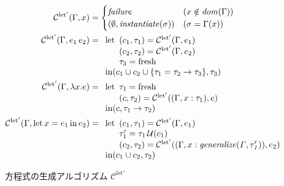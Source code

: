 \begin{figure}[htbp]
  \begin{align*}
    \mathcal C^\mathrm{let'}(\Gamma, x) &=
    \begin{cases}
      \mathit{failure}                          & (x \notin \mathit{dom}(\Gamma)) \\
      (\emptyset, \mathit{instantiate}(\sigma)) & (\sigma = \Gamma(x))
    \end{cases} \\
    \mathcal C^\mathrm{let'}(\Gamma, e_1 \, e_2) &=
    \begin{array}[t]{l}
      \mathrm{let}
        \begin{array}[t]{l}
          (c_1, \tau_1) = \mathcal C^\mathrm{let'}(\Gamma, e_1) \\
          (c_2, \tau_2) = \mathcal C^\mathrm{let'}(\Gamma, e_2) \\
          \tau_3 = \mathrm{fresh}
        \end{array} \\
      \mathrm{in} (c_1 \cup c_2 \cup \{\tau_1 = \tau_2 \to \tau_3\}, \tau_3)
    \end{array} \\
    \mathcal C^\mathrm{let'}(\Gamma, \lambda x . e) &=
    \begin{array}[t]{l}
      \mathrm{let}
        \begin{array}[t]{l}
          \tau_1 = \mathrm{fresh} \\
          (c, \tau_2) = \mathcal C^\mathrm{let'}((\Gamma, x : \tau_1), e)
        \end{array} \\
      \mathrm{in} (c, \tau_1 \to \tau_2)
    \end{array} \\
    \mathcal C^\mathrm{let'}(\Gamma, \mathrm{let} \, x = e_1 \, \mathrm{in} \, e_2) &=
    \begin{array}[t]{l}
      \mathrm{let}
        \begin{array}[t]{l}
          (c_1, \tau_1) = \mathcal C^\mathrm{let'}(\Gamma, e_1) \\
          \tau_1'       = \tau_1 \, \mathcal U(c_1) \\
          (c_2, \tau_2) = \mathcal C^\mathrm{let'}((\Gamma, x : \mathit{generalize(\Gamma, \tau_1')}) , e_2)
        \end{array} \\
      \mathrm{in} (c_1 \cup c_2, \tau_2)
    \end{array}
  \end{align*}
  \caption{方程式の生成アルゴリズム $\mathcal C^\mathrm{let'}$}
  \label{fig:algorithm-c-let2}
\end{figure}

